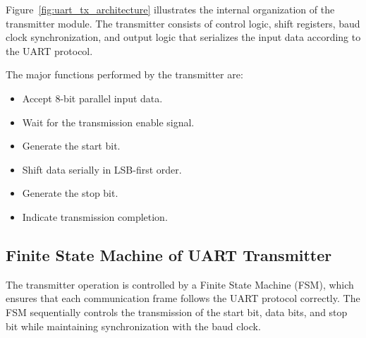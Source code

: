 Figure~\ref{fig:uart_tx_architecture} illustrates the internal organization of the transmitter module. The transmitter consists of control logic, shift registers, baud clock synchronization, and output logic that serializes the input data according to the UART protocol.

\vspace{0.3cm}

The major functions performed by the transmitter are:

\begin{itemize}

\item Accept 8-bit parallel input data.

\item Wait for the transmission enable signal.

\item Generate the start bit.

\item Shift data serially in LSB-first order.

\item Generate the stop bit.

\item Indicate transmission completion.

\end{itemize}


\subsection{Finite State Machine of UART Transmitter}

The transmitter operation is controlled by a Finite State Machine (FSM), which ensures that each communication frame follows the UART protocol correctly. The FSM sequentially controls the transmission of the start bit, data bits, and stop bit while maintaining synchronization with the baud clock.

